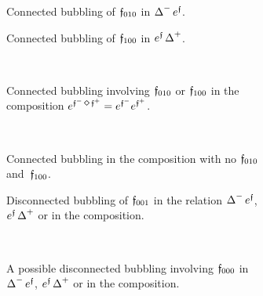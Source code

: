 \documentclass[\MainFolder/Text.tex]{subfiles}
\begin{document}
\begin{figure}
\centering
{ \begingroup \allowdisplaybreaks
\def\dist{0.25} %
  \def\rad{0.5} %
  \def\ecc{0.1} %
  \def\hght{1} %
  \def\dif{1.5} %
  \def\radO{\rad} %
  \def\eccO{\ecc} %
  \def\hghtO{2*\hght+\dist} %
  \def\difO{\dif} %
  \def\gencanc{0.05} %
  \def\genecc{20} %
  \def\genrad{0.45} %
\begin{subfigure}{.45\textwidth}
\centering

\caption{Connected bubbling of $\mathfrak{f}_{010}$ in $\operatorname{\Delta}^- e^{\mathfrak{f}}$.}
\end{subfigure}
\begin{subfigure}{.45\textwidth}
\centering

\caption{Connected bubbling of $\mathfrak{f}_{100}$ in $e^{\mathfrak{f}}\operatorname{\Delta}^+$.}
\end{subfigure}\\[.5cm]
\begin{subfigure}{\textwidth}
\centering

\caption{Connected bubbling involving $\mathfrak{f}_{010}$ or $\mathfrak{f}_{100}$ in the composition $e^{\MVMorF^-\DiamComp\MVMorF^+} = e^{\MVMorF^-}e^{\MVMorF^+}$.}
\end{subfigure}\\[.5cm]
\begin{subfigure}{.4\textwidth}
\centering

\caption{Connected bubbling in the composition with no $\mathfrak{f}_{010}$ and~$\mathfrak{f}_{100}$.}
\end{subfigure}
\hspace{.5cm}
\begin{subfigure}{.4\textwidth}
\centering

\caption{Disconnected bubbling of $\mathfrak{f}_{001}$ in the relation $\operatorname{\Delta}^- e^{\mathfrak{f}}$, $e^{\mathfrak{f}}\operatorname{\Delta}^+$ or in the composition.}
\end{subfigure}\\[.2cm]
\begin{subfigure}{.4\textwidth}
\centering

\caption{A possible disconnected bubbling involving $\mathfrak{f}_{000}$ in $\operatorname{\Delta}^- e^{\mathfrak{f}}$, $e^{\mathfrak{f}}\operatorname{\Delta}^+$ or in the composition.}
\end{subfigure}\\[.2cm]
\endgroup}
\caption[Bubbling in $\IBLInfty$-relations.]{
}
\end{figure}
\end{document}
